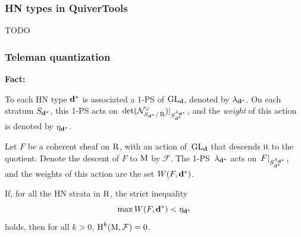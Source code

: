 \documentclass{beamer}
\begin{document}
\begin{frame}
    \frametitle{HN types in QuiverTools}
TODO
\end{frame}

\begin{frame}
    \frametitle{Teleman quantization}
\textbf{Fact:}

To each HN type $\mathbf{d}^*$ is associated a 1-PS of $\operatorname{GL}_{\mathbf{d}}$,
denoted by $\lambda_{\mathbf{d}^*}$.
On each stratum $S_{\mathbf{d}^*}$, this 1-PS acts
on~$\det(\mathcal{N}^{\vee}_{S_{\mathbf{d}^*}/\operatorname{R}})|_{S_{\mathbf{d}^*}^{\lambda_{\mathbf{d}^*}}}$,
and the \emph{weight} of this action is denoted by $\eta_{\mathbf{d}^*}$. \pause

Let $F$ be a coherent sheaf on $\operatorname{R}$, with an action of~$\operatorname{GL}_{\mathbf{d}}$
that descends it to the quotient.
Denote the descent of $F$ to $\operatorname{M}$ by $\mathcal{F}$. \pause
The 1-PS~$\lambda_{\mathbf{d}^*}$ acts on~$F|_{S_{\mathbf{d}^*}^{\lambda_{\mathbf{d}^*}}}$,
and the weights of this action are the set $W(F, \mathbf{d}^*)$. \pause

\begin{theorem}
If, for all the HN strata in $\operatorname{R}$, the strict inequality
\[\max W(F, \mathbf{d}^*) < \eta_{\mathbf{d}^*}\]
holds, then for all $k > 0$, $\operatorname{H}^k(\operatorname{M}, \mathcal{F}) = 0$.
\end{theorem}
\end{frame}


\end{document}
